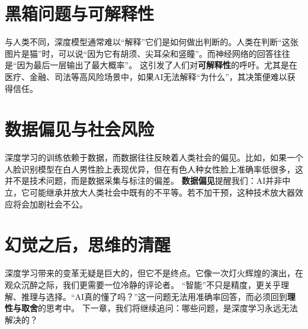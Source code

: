 \section*{黑箱问题与可解释性}
与人类不同，深度模型通常难以“解释”它们是如何做出判断的。人类在判断“这张图片是猫”时，可以说“因为它有胡须、尖耳朵和竖瞳”。而神经网络的回答往往是“因为最后一层输出了最大概率”。
这引发了人们对\textbf{可解释性}的呼吁。尤其是在医疗、金融、司法等高风险场景中，如果AI无法解释“为什么”，其决策便难以获得信任。
\section*{数据偏见与社会风险}
深度学习的训练依赖于数据，而数据往往反映着人类社会的偏见。比如，如果一个人脸识别模型在白人男性脸上表现优异，但在有色人种女性脸上准确率低很多，这并不是技术问题，而是数据采集与标注的偏差。
\textbf{数据偏见}提醒我们：AI并非中立，它可能继承并放大人类社会中既有的不平等。若不加干预，这种技术放大器效应将会加剧社会不公。
\section*{幻觉之后，思维的清醒}
深度学习带来的变革无疑是巨大的，但它不是终点。它像一次灯火辉煌的演出，在观众沉醉之际，我们更需要一位冷静的评论者。
“智能”不只是精度，更关乎理解、推理与选择。“AI真的懂了吗？”这一问题无法用准确率回答，而必须回到\textbf{理性与取舍}的思考中。
下一章，我们将继续追问：哪些问题，是深度学习永远无法解决的？
\nocite{*}
\printbibliography[heading=bibintoc, title=\ebibname]
\newpage
